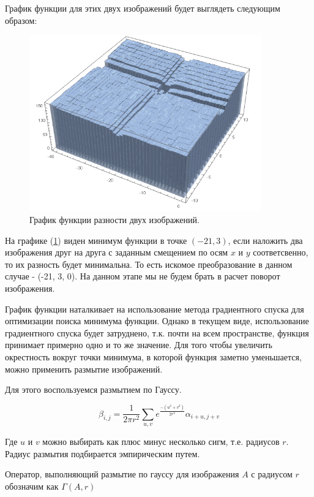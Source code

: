 \documentclass[a4paper,12pt]{article}
\begin{document}
График функции для этих двух изображений будет выглядеть следующим образом:

\begin{figure}[H]
    \centering
    \includegraphics[width=10cm]{pictures/Graphic1.png}
    \caption{График функции разности двух изображений.}
    \label{fig:graphic_delta} 
\end{figure}

На графике (\ref{fig:graphic_delta}) виден минимум функции в точке $(-21,3)$, если наложить два изображения друг на друга с заданным смещением по осям $x$ и $y$ соответсвенно, то их разность будет минимальна. То есть искомое преобразование в данном случае - (-21, 3, 0). На данном этапе мы не будем брать в расчет поворот изображения. 

График функции наталкивает на использование метода градиентного спуска для оптимизации поиска минимума функции. Однако в текущем виде, использование градиентного спуска будет затруднено, т.к. почти на всем пространстве, функция принимает примерно одно и то же значение. Для того чтобы увеличить окрестность вокруг точки минимума, в которой функция заметно уменьшается, можно применить размытие изображений.

Для этого воспользуемся размытием по Гауссу. 

\begin{equation}
    \beta_{i,j}=\frac{1}{2\pi r^2}\sum\limits_{u,v} e^\frac{-(u^2+v^2)}{2r^2} \alpha_{i+u,j+v}
\end{equation}

Где $u$ и $v$ можно выбирать как плюс минус несколько сигм, т.е. радиусов $r$. Радиус размытия подбирается эмпирическим путем.

Оператор, выполняющий размытие по гауссу для изображения $A$ с радиусом $r$ обозначим как $\Gamma(A,r)$
\end{document}
